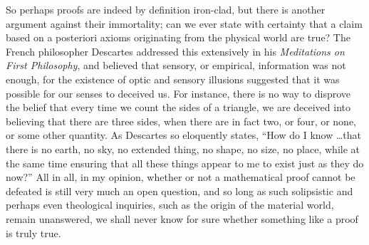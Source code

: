 \documentclass{mathbook}
\begin{document}
    So perhaps proofs are indeed by definition iron-clad, but there is another argument against their immortality; can we ever state with certainty that a claim based on a posteriori axioms originating from the physical world are true? The French philosopher Descartes addressed this extensively in his \emph{Meditations on First Philosophy}, \cite{Descartes1637} and believed that sensory, or empirical, information was not enough, for the existence of optic and sensory illusions suggested that it was possible for our senses to deceived us. For instance, there is no way to disprove the belief that every time we count the sides of a triangle, we are deceived into believing that there are three sides, when there are in fact two, or four, or none, or some other quantity. \cite{Newman2019} As Descartes so eloquently states, ``How do I know \dots that there is no earth, no sky, no extended thing, no shape, no size, no place, while at the same time ensuring that all these things appear to me to exist just as they do now?'' All in all, in my opinion, whether or not a mathematical proof cannot be defeated is still very much an open question, and so long as such solipsistic and perhaps even theological inquiries, such as the origin of the material world, remain unanswered, we shall never know for sure whether something like a proof is truly true.
\end{document}
